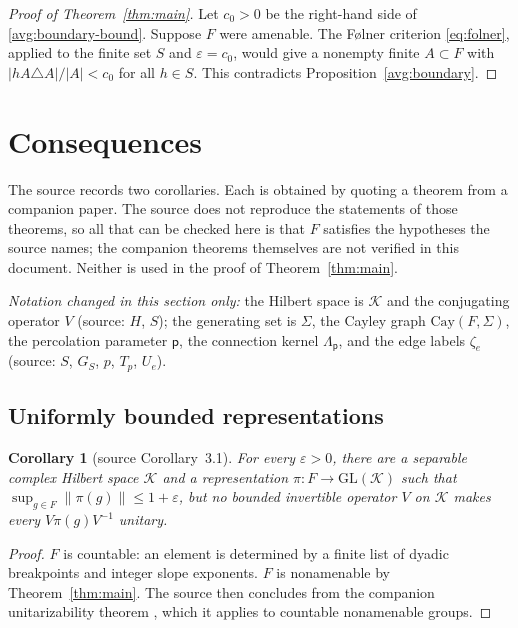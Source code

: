 \documentclass[11pt]{article}
\newcommand{\norm}[1]{\lVert #1\rVert}
\newtheorem{corollary}[theorem]{Corollary}
\theoremstyle{definition}
\numberwithin{equation}{section}
\begin{document}
\begin{proof}[Proof of Theorem~\ref{thm:main}]
Let \(c_0>0\) be the right-hand side of \eqref{avg:boundary-bound}.
Suppose \(F\) were amenable. The F\o lner criterion \eqref{eq:folner},
applied to the finite set \(S\) and \(\varepsilon=c_0\), would give a
nonempty finite \(A\subset F\) with \(|hA\triangle A|/|A|<c_0\) for all
\(h\in S\). This contradicts Proposition~\ref{avg:boundary}.
\end{proof}

\section{Consequences}\label{sec:consequences}

The source records two corollaries. Each is obtained by quoting a theorem
from a companion paper. The source does not reproduce the statements of
those theorems, so all that can be checked here is that \(F\) satisfies
the hypotheses the source names; the companion theorems themselves are
not verified in this document. Neither is used in the proof of
Theorem~\ref{thm:main}.

\emph{Notation changed in this section only:} the Hilbert space is
\(\mathcal K\) and the conjugating operator \(V\) (source: \(H\), \(S\));
the generating set is \(\Sigma\), the Cayley graph
\(\mathrm{Cay}(F,\Sigma)\), the percolation parameter \(\mathsf p\), the
connection kernel \(\Lambda_{\mathsf p}\), and the edge labels
\(\zeta_e\) (source: \(S\), \(G_S\), \(p\), \(T_p\), \(U_e\)).

\subsection{Uniformly bounded representations}

\begin{corollary}[source Corollary~3.1]\label{cor:nonunitarizable}
For every \(\varepsilon>0\), there are a separable complex Hilbert space
\(\mathcal K\) and a representation
\(\pi:F\to\mathrm{GL}(\mathcal K)\) such that
\(\sup_{g\in F}\norm{\pi(g)}\le1+\varepsilon\), but no bounded invertible
operator \(V\) on \(\mathcal K\) makes every \(V\pi(g)V^{-1}\) unitary.
\end{corollary}

\begin{proof}
\(F\) is countable: an element is determined by a finite list of dyadic
breakpoints and integer slope exponents. \(F\) is nonamenable by
Theorem~\ref{thm:main}. The source then concludes from the companion
unitarizability theorem \cite[Theorem~1.1]{OpenAIUnitarizability2026},
which it applies to countable nonamenable groups.
\end{proof}
\end{document}
